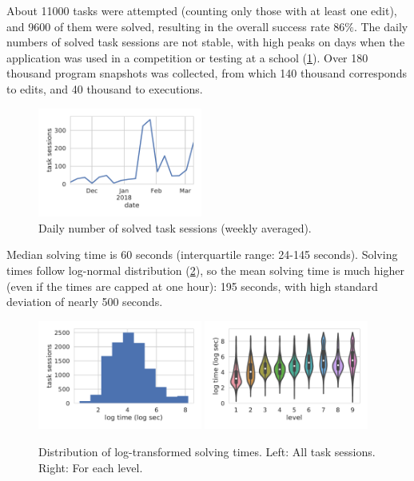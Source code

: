 About 11000 tasks were attempted (counting only those with at least one edit),
and 9600 of them were solved,
resulting in the overall success rate $86\%$.
The daily numbers of solved task sessions are not stable,
with high peaks on days when the application was used
in a competition or testing at a school
(\cref{fig:daily-task-sessions}).
Over 180 thousand program snapshots was collected,
from which 140 thousand corresponds to edits,
and 40 thousand to executions.

\begin{figure}[htb]
\centering
\includegraphics[width=0.48\textwidth,trim={0 21mm 0 7mm},clip]{img/daily-task-sessions}
\caption{Daily number of solved task sessions (weekly averaged).}
\label{fig:daily-task-sessions}
\end{figure}

Median solving time is 60 seconds (interquartile range: 24-145 seconds).
Solving times follow log-normal distribution (\cref{fig:solving-times}),
so the mean solving time is much higher (even if the times are capped at one hour):
195 seconds, with high standard deviation of nearly 500 seconds.


\begin{figure}[htb]
\centering
\includegraphics[width=0.48\textwidth]{img/task-sessions-time-log}
\includegraphics[width=0.48\textwidth]{img/levels-time}
\caption{%
  Distribution of log-transformed solving times.
  Left: All task sessions.
  Right: For each level.}
\label{fig:solving-times}
\end{figure}

